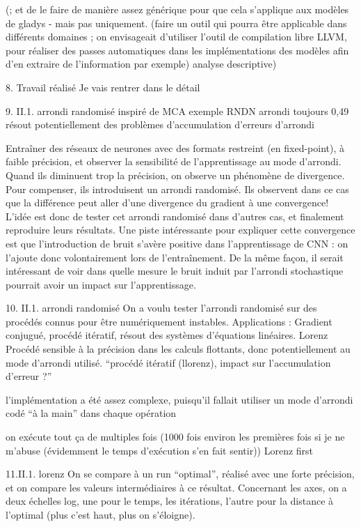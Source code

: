 \documentclass[a4paper,11pt]{report}
\begin{document}
 (; et de le faire de manière assez générique pour que cela s’applique aux modèles de gladys - mais pas uniquement.
(faire un outil qui pourra être applicable dans différents domaines ; on envisageait d’utiliser l’outil de compilation libre LLVM, pour réaliser des passes automatiques dans les implémentations des modèles afin d’en extraire de l’information par exemple)
analyse descriptive)

8. Travail réalisé
Je vais rentrer dans le détail

9. II.1. arrondi randomisé
inspiré de MCA
exemple RNDN arrondi toujours 0,49
résout potentiellement des problèmes d’accumulation d’erreurs d’arrondi

Entraîner des réseaux de neurones avec des formats restreint (en fixed-point), à faible précision, et observer la sensibilité de l’apprentissage au mode d’arrondi.
Quand ils diminuent trop la précision, on observe un phénomène de divergence. Pour compenser, ils introduisent un arrondi randomisé.
Ils observent dans ce cas que la différence peut aller d’une divergence du gradient à une convergence!
L’idée est donc de tester cet arrondi randomisé dans d’autres cas, et finalement reproduire leurs résultats.
Une piste intéressante pour expliquer cette convergence est que l’introduction de bruit s’avère positive dans l’apprentissage de CNN : on l’ajoute donc volontairement lors de l’entraînement. De la même façon, il serait intéressant de voir dans quelle mesure le bruit induit par l’arrondi stochastique pourrait avoir un impact sur l’apprentissage.

10. II.1. arrondi randomisé
On a voulu tester l’arrondi randomisé sur des procédés connus pour être numériquement instables.
Applications : 
Gradient conjugué, procédé itératif, résout des systèmes d’équations linéaires.
Lorenz Procédé sensible à la précision dans les calculs flottants, donc potentiellement au mode d’arrondi utilisé.
“procédé itératif (llorenz), impact sur l’accumulation d’erreur ?”

l’implémentation a été assez complexe, puisqu’il fallait utiliser un mode d’arrondi codé “à la main” dans chaque opération

on exécute tout ça de multiples fois (1000 fois environ les premières fois si je ne m’abuse (évidemment le temps d’exécution s’en fait sentir))
Lorenz first

11.II.1. lorenz
On se compare à un run “optimal”, réalisé avec une forte précision, et on compare les valeurs intermédiaires à ce résultat.
Concernant les axes, on a deux échelles log, une pour le temps, les itérations, l’autre pour la distance à l’optimal (plus c’est haut, plus on s’éloigne).
\end{document}
